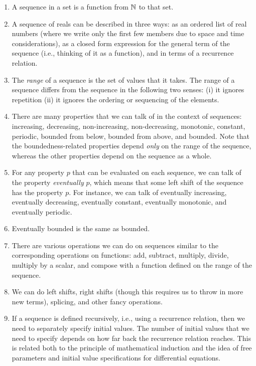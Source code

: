 \documentclass{amsart}
\begin{document}
\begin{enumerate}
\item A sequence in a set is a function from $\mathbb{N}$ to that set.
\item A sequence of reals can be described in three ways: as an
  ordered list of real numbers (where we write only the first few
  members due to space and time considerations), as a closed form
  expression for the general term of the sequence (i.e., thinking of
  it as a function), and in terms of a recurrence relation.
\item The {\em range} of a sequence is the set of values that it
  takes. The range of a sequence differs from the sequence in the
  following two senses: (i) it ignores repetition (ii) it ignores the
  ordering or sequencing of the elements.
\item There are many properties that we can talk of in the context of
  sequences: increasing, decreasing, non-increasing, non-decreasing,
  monotonic, constant, periodic, bounded from below, bounded from
  above, and bounded. Note that the boundedness-related properties
  depend {\em only} on the range of the sequence, whereas the other
  properties depend on the sequence as a whole.
\item For any property $p$ that can be evaluated on each sequence, we
  can talk of the property {\em eventually} $p$, which means that some
  left shift of the sequence has the property $p$. For instance, we
  can talk of eventually increasing, eventually decreasing, eventually
  constant, eventually monotonic, and eventually periodic.
\item Eventually bounded is the same as bounded.
\item There are various operations we can do on sequences similar to
  the corresponding operations on functions: add, subtract, multiply,
  divide, multiply by a scalar, and compose with a function defined on
  the range of the sequence.
\item We can do left shifts, right shifts (though this requires us to
  throw in more new terms), splicing, and other fancy operations.
\item If a sequence is defined recursively, i.e., using a recurrence
  relation, then we need to separately specify initial values. The
  number of initial values that we need to specify depends on how far
  back the recurrence relation reaches. This is related both to the
  principle of mathematical induction and the idea of free parameters
  and initial value specifications for differential equations.

\end{enumerate}
\end{document}
